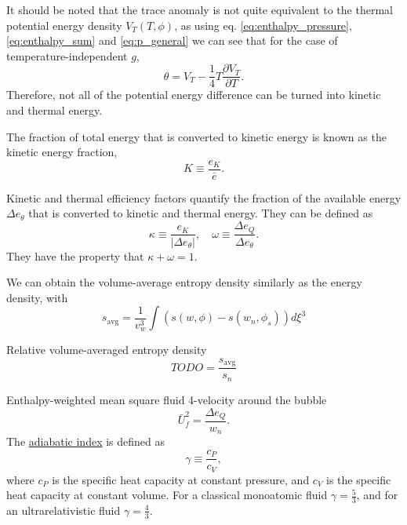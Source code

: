 It should be noted that the trace anomaly is not quite equivalent to the thermal potential energy density $V_T(T,\phi)$, as using eq. \eqref{eq:enthalpy_pressure}, \eqref{eq:enthalpy_sum} and \eqref{eq:p_general} we can see that for the case of temperature-independent $g$,
\begin{equation}
\theta = V_T - \frac{1}{4} T \frac{\partial V_T}{\partial T}.
\end{equation}
Therefore, not all of the potential energy difference can be turned into kinetic and thermal energy.
\cite[ch. B.2]{hindmarsh_gw_pt_2019}

The fraction of total energy that is converted to kinetic energy is known as the kinetic energy fraction,
\begin{equation}
K \equiv \frac{e_K}{\bar{e}}.
\end{equation}

Kinetic and thermal efficiency factors quantify the fraction of the available energy $\Delta e_\theta$ that is converted to kinetic and thermal energy.
They can be defined as
\begin{equation}
\kappa \equiv \frac{e_K}{| \Delta e_\theta |}, \quad
\omega \equiv \frac{\Delta e_Q}{\Delta e_\theta}.
\end{equation}
They have the property that $\kappa + \omega = 1$.

We can obtain the volume-average entropy density similarly as the energy density, with
\begin{equation}
s_\text{avg} = \frac{1}{v_w^3} \int \left( s(w,\phi) - s(w_n, \phi_s) \right) d\xi^3
\end{equation}

Relative volume-averaged entropy density
\begin{equation}
TODO = \frac{s_\text{avg}}{s_n}
\end{equation}

Enthalpy-weighted mean square fluid 4-velocity around the bubble
\begin{equation}
\bar{U}_f^2 = \frac{\Delta e_Q}{w_n}.
\end{equation}
The \href{https://en.wikipedia.org/wiki/Heat_capacity_ratio}{adiabatic index} is defined as
\begin{equation}
\gamma \equiv \frac{c_P}{c_V},
\end{equation}
where $c_P$ is the specific heat capacity at constant pressure,
and $c_V$ is the specific heat capacity at constant volume.
For a classical monoatomic fluid $\gamma = \frac{5}{3}$,
and for an ultrarelativistic fluid $\gamma = \frac{4}{3}$.

